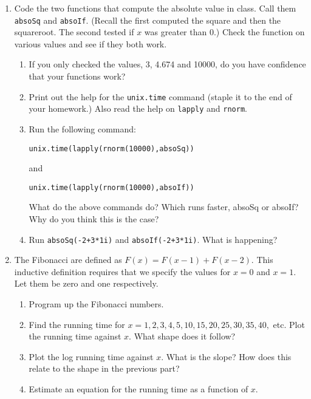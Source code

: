 \begin{enumerate}
\item Code the two functions that compute the absolute value in
class.  Call them {\tt absoSq} and {\tt absoIf}.  (Recall the first
computed the square and then the squareroot.  The second tested if $x$
was greater than 0.)  Check the function on various values and see if
they both work.
\begin{enumerate}
\item If you only checked the values, 3, 4.674 and 10000, do you have
confidence that your functions work?
\item Print out the help for the {\tt unix.time} command (staple it to
the end of your homework.)  Also read the help on {\tt lapply} and
{\tt rnorm}.
\item Run the following command:

\centerline{\tt unix.time(lapply(rnorm(10000),absoSq))}
and

\centerline{\tt unix.time(lapply(rnorm(10000),absoIf))}

What do the above commands do?  Which runs faster, absoSq or absoIf?
Why do you think this is the case?
\item Run {\tt absoSq(-2+3*1i)} and {\tt absoIf(-2+3*1i)}.  What is
happening? 
\end{enumerate}

\vspace{2ex}

\item The Fibonacci are defined as $F(x) = F(x - 1) + F(x-2)$.  This
inductive definition requires that we specify the values for $x=0$ and
$x=1$.  Let them be zero and one respectively.
\begin{enumerate}
\item Program up the Fibonacci numbers.
\item Find the running time for $x=1,2,3,4,5,10,15,20,25,30,35,40,$ etc.
Plot the running time against $x$.  What shape does it follow?
\item Plot the log running time against $x$.  What is the
slope?  How does this relate to the shape in the previous part?
\item Estimate an equation for the running time as a function of $x$.
\end{enumerate}
\end{enumerate}



